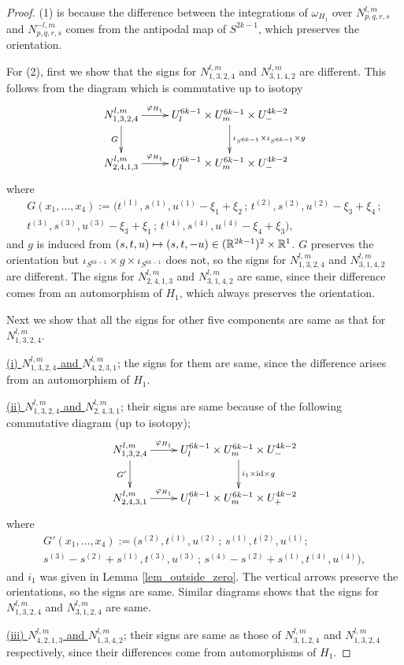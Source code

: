 \begin{proof}
(1) is because the difference between the integrations of $\omega_{H_1}$ over $N^{l,m}_{p,q,r,s}$ and
$N^{-l,m}_{p,q,r,s}$ comes from the antipodal map of $S^{2k-1}$, which preserves the orientation.


For (2), first we show that the signs for $N^{l,m}_{1,3,2,4}$ and $N^{l,m}_{3,1,4,2}$ are different.
This follows from the diagram which is commutative up to isotopy
\[
 \xymatrix{
  N^{l,m}_{1,3,2,4} \ar[d]_-G \ar[r]^-{\varphi_{H_1}} & U^{6k-1}_l \times U^{6k-1}_m \times U^{4k-2}_-
   \ar[d]^-{\iota_{S^{6k-1}} \times \iota_{S^{6k-1}} \times g} \\
  N^{l,m}_{2,4,1,3} \ar[r]^-{\varphi_{H_1}} & U^{6k-1}_l \times U^{6k-1}_m \times U^{4k-2}_-
 }
\]
where
\begin{multline*}
 G(x_1 ,\dots ,x_4 ) := (t^{(1)},s^{(1)},u^{(1)}-\xi_1 +\xi_2 \, ; \, t^{(2)},s^{(2)},u^{(2)}-\xi_3 +\xi_4 \, ; \\
 t^{(3)},s^{(3)},u^{(3)}-\xi_3 +\xi_1 \, ; \, t^{(4)},s^{(4)},u^{(4)}-\xi_4 +\xi_3 ),
\end{multline*}
and $g$ is induced from $(s,t,u)\mapsto (s,t,-u)\in (\mathbb{R}^{2k-1})^2 \times \mathbb{R}^1$.
$G$ preserves the orientation but $\iota_{S^{6k-1}} \times g \times \iota_{S^{6k-1}}$ does not, so the signs for
$N^{l,m}_{1,3,2,4}$ and $N^{l,m}_{3,1,4,2}$ are different.
The signs for $N^{l,m}_{2,4,1,3}$ and $N^{l,m}_{3,1,4,2}$ are same, since their difference comes from an automorphism
of $H_1$, which always preserves the orientation.


Next we show that all the signs for other five components are same as that for $N^{l,m}_{1,3,2,4}$.


\noindent
\underline{(i) $N^{l,m}_{1,3,2,4}$ and $N^{l,m}_{4,2,3,1}$};
the signs for them are same, since the difference arises from an automorphism of $H_1$.


\noindent
\underline{(ii) $N^{l,m}_{1,3,2,4}$ and $N^{l,m}_{2,4,3,1}$};
their signs are same because of the following commutative diagram (up to isotopy);
\[
 \xymatrix{
  N^{l,m}_{1,3,2,4} \ar[d]_-{G'} \ar[r]^-{\varphi_{H_1}} & U^{6k-1}_l \times U^{6k-1}_m \times U^{4k-2}_-
   \ar[d]^-{i_1 \times \id \times g} \\
  N^{l,m}_{2,4,3,1} \ar[r]^-{\varphi_{H_1}} & U^{6k-1}_l \times U^{6k-1}_m \times U^{4k-2}_+
 }
\]
where
\begin{multline*}
 G'(x_1 ,\dots ,x_4 ) := (s^{(2)},t^{(1)},u^{(2)} \, ; \, s^{(1)},t^{(2)},u^{(1)} ; \\
 s^{(3)}-s^{(2)}+s^{(1)},t^{(3)},u^{(3)} \, ; \, s^{(4)}-s^{(2)}+s^{(1)},t^{(4)},u^{(4)}),
\end{multline*}
and $i_1$ was given in Lemma \ref{lem_outside_zero}.
The vertical arrows preserve the orientations, so the signs are same.
Similar diagrams shows that the signs for $N^{l,m}_{1,3,2,4}$ and $N^{l,m}_{3,1,2,4}$ are same.


\noindent
\underline{(iii) $N^{l,m}_{4,2,1,3}$ and $N^{l,m}_{1,3,4,2}$};
their signs are same as those of $N^{l,m}_{3,1,2,4}$ and $N^{l,m}_{1,3,2,4}$ respectively, since their differences
come from automorphisms of $H_1$.
\end{proof}


